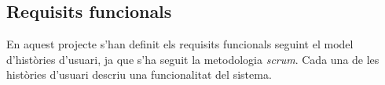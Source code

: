 \subsection{Requisits funcionals}

En aquest projecte s'han definit els requisits funcionals seguint el model d'històries d'usuari, ja que s'ha seguit la metodologia \textit{scrum}. Cada una de les històries d'usuari descriu una funcionalitat del sistema.











